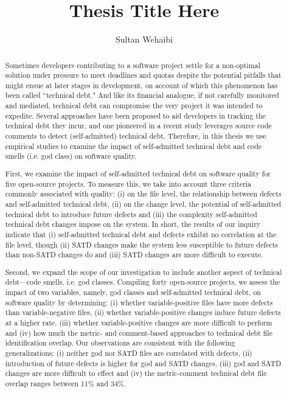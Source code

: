\documentclass[12pt]{report}
\author{Sultan Wehaibi}
\title {Thesis Title Here}
\newcommand{\SATD}{self-admitted technical debt\xspace}
\begin{document}
\begin{abstract}
	
	

Sometimes developers contributing to a software project settle for a non-optimal solution under pressure to meet deadlines and quotas despite the potential pitfalls that might ensue at later stages in development, on account of which this phenomenon has been called ``technical debt." And like its financial analogue, if not carefully monitored and mediated, technical debt can compromise the very project it was intended to expedite. Several approaches have been proposed to aid developers in tracking the technical debt they incur, and one pioneered in a recent study leverages source code comments to detect (self-admitted) technical debt. Therefore, in this thesis we use empirical studies to examine the impact of self-admitted technical debt and code smells (i.e. god class) on software quality.

First, we examine the impact of \SATD on software quality for five open-source projects. To measure this, we take into account three criteria commonly associated with quality: (i) on the file level, the relationship between defects and \SATD, (ii) on the change level, the potential of \SATD to introduce future defects and (iii) the complexity \SATD changes impose on the system. In short, the results of our inquiry indicate that (i) \SATD and defects exhibit no correlation at the file level, though (ii) SATD changes make the system less susceptible to future defects than non-SATD changes do and (iii) SATD changes are more difficult to execute.

Second, we expand the scope of our investigation to include another aspect of technical debt---code smells, i.e. god classes. Compiling forty open-source projects, we assess the impact of two variables, namely, god classes and \SATD, on software quality by determining: (i) whether variable-positive files have more defects than variable-negative files, (ii) whether variable-positive changes induce future defects at a higher rate, (iii) whether variable-positive changes are more difficult to perform and (iv) how much the metric- and comment-based approaches to technical debt file identification overlap. Our observations are consistent with the following generalizations: (i) neither god nor SATD files are correlated with defects, (ii) introduction of future defects is higher for god and SATD changes, (iii) god and SATD changes are more difficult to effect and (iv) the metric-comment technical debt file overlap ranges between 11\% and 34\%.


\end{abstract}
\end{document}
